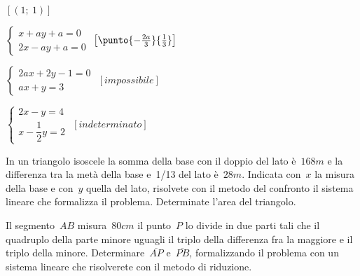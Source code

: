 \begin{esercizio}[\Ast]
\begin{multicols}{2}
\begin{enumeratea}
 \hfill $\left[(1;~1)\right]$
 \item $\left\{\begin{array}{l}x+ay+a=0\\2x-ay+a=0\end{array}\right.$
 \hfill $\left[\punto{-\frac{2a}{3}}{\-\frac{1}{3}}\right]$
 \item $\left\{\begin{array}{l}2ax+2y-1=0\\ax+y=3\end{array}\right.$
 \hfill $\left[impossibile\right]$
 \item $\left\{\begin{array}{l}2x-y=4\\x-\dfrac{1}{2}y=2\end{array}\right.$
 \hfill $\left[indeterminato\right]$
\end{enumeratea}
 \end{multicols}
\end{esercizio}

\begin{esercizio}
 \label{ese:22.19}
In un triangolo isoscele la somma della base con il doppio del lato
è~$168\unit{m}$ e la differenza tra la metà della base e~1/13 del lato 
è~$28\unit{m}$.
Indicata con~$x$ la misura della base e con~$y$ quella del lato,
risolvete con il metodo del confronto il sistema lineare che formalizza
il problema. Determinate l'area del triangolo.
 \end{esercizio}

\begin{esercizio}
 \label{ese:22.23}
Il segmento~$AB$ misura~$80\unit{cm}$ il punto~$P$ lo divide in due parti tali 
che il quadruplo della parte minore uguagli il triplo della differenza fra 
la maggiore e il triplo della minore. 
Determinare~$\overline{AP}$ e~$\overline{PB}$, formalizzando
il problema con un sistema lineare che risolverete con il metodo di
riduzione.
\begin{center}
 
\end{center}
\end{esercizio}

